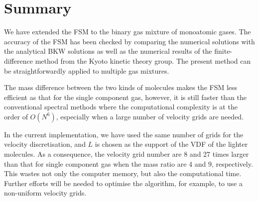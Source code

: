 \section{Summary}


We have extended the FSM to the binary gas mixture of monoatomic gases. The accuracy of the FSM has been checked by comparing the numerical solutions with the analytical BKW solutions as well as the numerical results of the finite-difference method from the Kyoto kinetic theory group. The present method can be straightforwardly applied to multiple gas mixtures. 


The mass difference between the two kinds of molecules makes the FSM less efficient as that for the single component gas, however, it is still faster than the conventional spectral methods where the computational complexity is at the order of $O(N^6)$, especially when a large number of velocity grids are needed. 


In the current implementation, we have used the same number of grids for the velocity discretisation, and $L$ is chosen as the support of the VDF of the lighter molecules. As a consequence, the velocity grid number are 8 and 27 times larger than that for single component gas when the mass ratio are 4 and 9, respectively. This wastes not only the computer memory, but also the computational time. Further efforts will be needed to optimise the algorithm, for example, to use a non-uniform velocity grids. 


